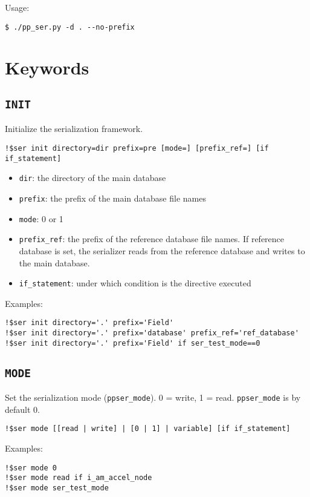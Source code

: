 \documentclass{article}
\begin{document}
Usage:
\begin{lstlisting}
$ ./pp_ser.py -d . --no-prefix
\end{lstlisting}

\section{Keywords}

\subsection{\texttt{INIT}}
Initialize the serialization framework.

\begin{lstlisting}
!$ser init directory=dir prefix=pre [mode=] [prefix_ref=] [if if_statement]
\end{lstlisting}

\begin{itemize}
\item \texttt{dir}: the directory of the main database
\item \texttt{prefix}: the prefix of the main database file names
\item \texttt{mode}: 0 or 1
\item \texttt{prefix\_ref}: the prefix of the reference database file names. If reference database is set, the serializer reads from the reference database and writes to the main database.
\item \texttt{if\_statement}: under which condition is the directive executed
\end{itemize}

Examples:
\begin{lstlisting}
!$ser init directory='.' prefix='Field'
!$ser init directory='.' prefix='database' prefix_ref='ref_database'
!$ser init directory='.' prefix='Field' if ser_test_mode==0
\end{lstlisting}

\subsection{\texttt{MODE}}
Set the serialization mode (\texttt{ppser\_mode}). 0 = write, 1 = read. \texttt{ppser\_mode} is by default 0.

\begin{lstlisting}
!$ser mode [[read | write] | [0 | 1] | variable] [if if_statement]
\end{lstlisting}

Examples:
\begin{lstlisting}
!$ser mode 0
!$ser mode read if i_am_accel_node
!$ser mode ser_test_mode
\end{lstlisting}
\end{document}
